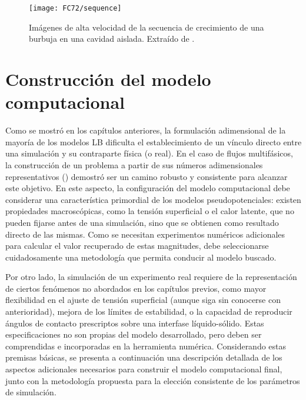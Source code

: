 \begin{figure}[ht]
	\centering
	\texttt{[image: FC72/sequence]}
	\caption{Im\'agenes de alta velocidad de la secuencia de crecimiento de una burbuja en una cavidad aislada. Extra\'ido de \cite{hutter_experimental_2010}.}
	\label{fig:sequence}
\end{figure}





\section{Construcci\'on del modelo computacional}

Como se mostr\'o en los cap\'itulos anteriores, la formulaci\'on adimensional de la mayor\'ia de los modelos LB dificulta el establecimiento de un v\'inculo directo entre una simulaci\'on y su contraparte f\'isica (o real). En el caso de flujos multif\'asicos, la construcci\'on de un problema a partir de sus n\'umeros adimensionales representativos () demostr\'o ser un camino robusto y consistente para alcanzar este objetivo. En este aspecto, la configuraci\'on del modelo computacional debe considerar una caracter\'istica primordial de los modelos pseudopotenciales: existen propiedades macrosc\'opicas, como la tensi\'on superficial o el calor latente, que no pueden fijarse antes de una simulaci\'on, sino que se obtienen como resultado directo de las mismas. Como se necesitan experimentos num\'ericos adicionales para calcular el valor recuperado de estas magnitudes, debe seleccionarse cuidadosamente una metodolog\'ia que permita conducir al modelo buscado.

Por otro lado, la simulaci\'on de un experimento real requiere de la representaci\'on de ciertos fen\'omenos no abordados en los cap\'itulos previos, como mayor flexibilidad en el ajuste de tensi\'on superficial (aunque siga sin conocerse con anterioridad), mejora de los l\'imites de estabilidad, o la capacidad de reproducir \'angulos de contacto prescriptos sobre una interfase l\'iquido-s\'olido. Estas especificaciones no son propias del modelo desarrollado, pero deben ser comprendidas e incorporadas en la herramienta num\'erica. Considerando estas premisas b\'asicas, se presenta a continuaci\'on una descripci\'on detallada de los aspectos adicionales necesarios para construir el modelo computacional final, junto con la metodolog\'ia propuesta para la elecci\'on consistente de los par\'ametros de simulaci\'on.




